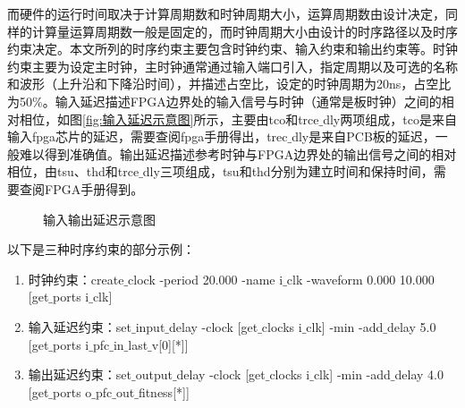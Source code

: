 而硬件的运行时间取决于计算周期数和时钟周期大小，运算周期数由设计决定，同样的计算量运算周期数一般是固定的，而时钟周期大小由设计的时序路径以及时序约束决定。本文所列的时序约束主要包含时钟约束、输入约束和输出约束等。时钟约束主要为设定主时钟，主时钟通常通过输入端口引入，指定周期以及可选的名称和波形（上升沿和下降沿时间），并描述占空比，设定的时钟周期为20ns，占空比为50$\%$。输入延迟描述FPGA边界处的输入信号与时钟（通常是板时钟）之间的相对相位，如图\ref{fig:输入延迟示意图}所示，主要由tco和trce$\_$dly两项组成，tco是来自输入fpga芯片的延迟，需要查阅fpga手册得出，trec$\_$dly是来自PCB板的延迟，一般难以得到准确值。输出延迟描述参考时钟与FPGA边界处的输出信号之间的相对相位，由tsu、thd和trce$\_$dly三项组成，tsu和thd分别为建立时间和保持时间，需要查阅FPGA手册得到。
\begin{figure}[htb]
  \centering
  \caption{输入输出延迟示意图}
  \label{fig:输入输出延迟示意图}
\end{figure}

以下是三种时序约束的部分示例：
\begin{enumerate}
  \item 时钟约束：create$\_$clock -period 20.000 -name i$\_$clk -waveform {0.000 10.000} [get$\_$ports i$\_$clk]
  \item 输入延迟约束：set$\_$input$\_$delay -clock [get$\_$clocks i$\_$clk] -min -add$\_$delay 5.0 [get$\_$ports {i$\_$pfc$\_$in$\_$last$\_$v[0][*]}]
  \item 输出延迟约束：set$\_$output$\_$delay -clock [get$\_$clocks i$\_$clk] -min -add$\_$delay 4.0 [get$\_$ports {o$\_$pfc$\_$out$\_$fitness[*]}]
\end{enumerate}

